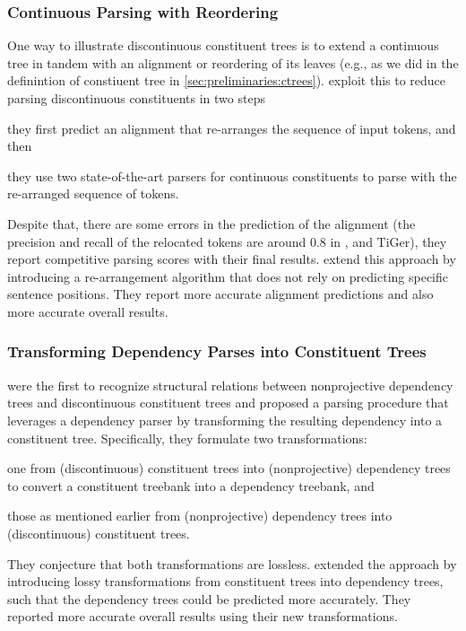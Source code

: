 \documentclass[../document.tex]{subfiles}
\begin{document}
    \subsubsection*{Continuous Parsing with Reordering}
    One way to illustrate discontinuous constituent trees is to extend a continuous tree in tandem with an alignment or reordering of its leaves (e.g.\@,  as we did in the definintion of constiuent tree in \cref{sec:preliminaries:ctrees}).
    \citet{FerGon21a} exploit this to reduce parsing discontinuous constituents in two steps
    \begin{inparaenum}[]
        \item they first predict an alignment that re-arranges the sequence of input tokens, and then
        \item they use two state-of-the-art parsers for continuous constituents to parse with the re-arranged sequence of tokens.
    \end{inparaenum}
    Despite that, there are some errors in the prediction of the alignment (the precision and recall of the relocated tokens are around $0.8$ in ,  and TiGer), they report competitive parsing scores with their final results.
    \citet{Sun22} extend this approach by introducing a re-arrangement algorithm that does not rely on predicting specific sentence positions.
    They report more accurate alignment predictions and also more accurate overall results.

    \subsubsection*{Transforming Dependency Parses into Constituent Trees}
    \citet{Hall08} were the first to recognize structural relations between nonprojective dependency trees and discontinuous constituent trees and proposed a parsing procedure that leverages a dependency parser by transforming the resulting dependency into a constituent tree.
    Specifically, they formulate two transformations:
    \begin{inparaenum}[]
        \item one from (discontinuous) constituent trees into (nonprojective) dependency trees to convert a constituent treebank into a dependency treebank, and
        \item those as mentioned earlier from (nonprojective) dependency trees into (discontinuous) constituent trees.
    \end{inparaenum}
    They conjecture that both transformations are lossless.
    \citet{Ferandez15} extended the approach by introducing lossy transformations from constituent trees into dependency trees, such that the dependency trees could be predicted more accurately.
    They reported more accurate overall results using their new transformations.
\end{document}
